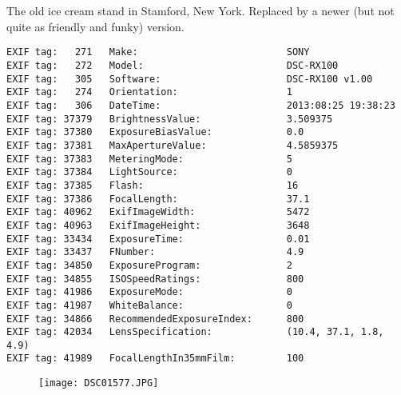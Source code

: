 \section{\protect{}}
\noindent The old ice cream stand in Stamford, New York. Replaced by a newer (but not quite as friendly and funky) version.
\noindent
\begin{lstlisting}
EXIF tag:   271   Make:                          SONY
EXIF tag:   272   Model:                         DSC-RX100
EXIF tag:   305   Software:                      DSC-RX100 v1.00
EXIF tag:   274   Orientation:                   1
EXIF tag:   306   DateTime:                      2013:08:25 19:38:23
EXIF tag: 37379   BrightnessValue:               3.509375
EXIF tag: 37380   ExposureBiasValue:             0.0
EXIF tag: 37381   MaxApertureValue:              4.5859375
EXIF tag: 37383   MeteringMode:                  5
EXIF tag: 37384   LightSource:                   0
EXIF tag: 37385   Flash:                         16
EXIF tag: 37386   FocalLength:                   37.1
EXIF tag: 40962   ExifImageWidth:                5472
EXIF tag: 40963   ExifImageHeight:               3648
EXIF tag: 33434   ExposureTime:                  0.01
EXIF tag: 33437   FNumber:                       4.9
EXIF tag: 34850   ExposureProgram:               2
EXIF tag: 34855   ISOSpeedRatings:               800
EXIF tag: 41986   ExposureMode:                  0
EXIF tag: 41987   WhiteBalance:                  0
EXIF tag: 34866   RecommendedExposureIndex:      800
EXIF tag: 42034   LensSpecification:             (10.4, 37.1, 1.8, 4.9)
EXIF tag: 41989   FocalLengthIn35mmFilm:         100

\end{lstlisting}
\clearpage
\begin{figure}
\raggedleft
\texttt{[image: DSC01577.JPG]}
\end{figure}


\clearpage
